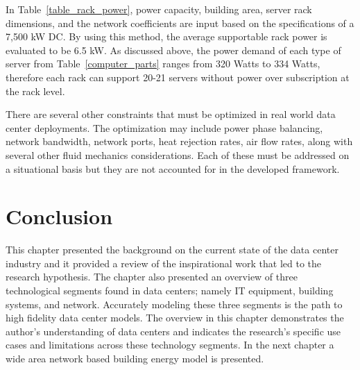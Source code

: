      In Table~\ref{table_rack_power}, power capacity, building area, server rack dimensions, and the network coefficients are input based on the specifications of a 7,500 kW DC. By using this method, the average supportable rack power is evaluated to be 6.5 kW. As discussed above, the power demand of each type of server from Table~\ref{computer_parts} ranges from 320 Watts to 334 Watts, therefore each rack can support 20-21 servers without power over subscription at the rack level.
    
    
    
    There are several other constraints that must be optimized in real world data center deployments. The optimization may include power phase balancing, network bandwidth, network ports, heat rejection rates, air flow rates, along with several other fluid mechanics considerations. Each of these must be addressed on a situational basis but they are not accounted for in the developed framework.
        
    \section{Conclusion}
    \label{sec: conclusion}
    This chapter presented the background on the current state of the data center industry and it provided a review of the inspirational work that led to the research hypothesis. The chapter also presented an overview of three technological segments found in data centers; namely IT equipment, building systems, and network. Accurately modeling these three segments is the path to high fidelity data center models. The overview in this chapter demonstrates the author's understanding of data centers and indicates the research's specific use cases and limitations across these technology segments. In the next chapter a wide area network based building energy model is presented.
    
   
    

    
    

